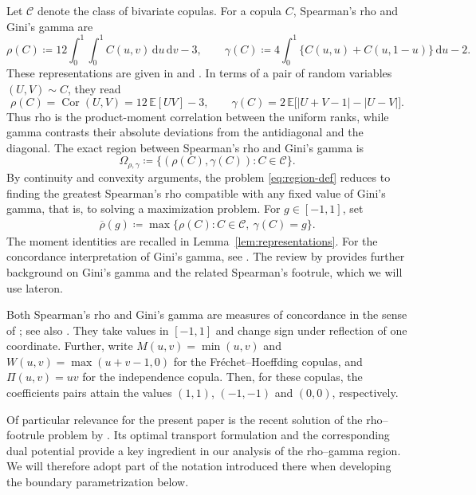 \documentclass{article}
\theoremstyle{definition}
\theoremstyle{remark}
\newcommand{\1}{\mathds{1}}
\newcommand{\de}{\,\mathrm{d}}
\newcommand{\E}{\mathbb{E}}
\newcommand{\CC}{\mathcal{C}}
\newcommand{\Om}{\Omega_{\rho,\gamma}}
\newcommand{\rhoup}{\overline{\rho}}
\begin{document}
Let $\CC$ denote the class of bivariate copulas.
For a copula $C$, Spearman's rho and Gini's gamma are
\begin{equation}\label{eq:defs}
    \rho(C)\coloneqq12\int_0^1\!\int_0^1C(u,v)\de u\de v-3,
    \qquad
    \gamma(C)\coloneqq4\int_0^1\bigl\{C(u,u)+C(u,1-u)\bigr\}\de u-2.
\end{equation}
These representations are given in \citet[Section~5.1]{nelsen2006introduction} and
\citet[Section~2]{bukovsek2021spearman}.
In terms of a pair of random variables $(U,V)\sim C$, they read
\begin{equation}\label{eq:intro-rank-moments}
    \rho(C)=\operatorname{Cor}(U,V)=12\,\E[UV]-3,
    \qquad
    \gamma(C)=2\,\E\bigl[|U+V-1|-|U-V|\bigr].
\end{equation}
Thus rho is the product-moment correlation between the uniform ranks, while
gamma contrasts their absolute deviations from the antidiagonal and the
diagonal.
The exact region between Spearman's rho and Gini's gamma is
\begin{equation}\label{eq:region-def}
    \Om\coloneqq\{(\rho(C),\gamma(C)):C\in\CC\}.
\end{equation}
By continuity and convexity arguments, the problem \eqref{eq:region-def} reduces to finding the
greatest Spearman's rho compatible with any fixed value of Gini's
gamma, that is, to solving a maximization problem.
For $g\in[-1,1]$, set
\begin{align}\label{def_optim_problem}
    \rhoup(g)\coloneqq\max\{\rho(C):C\in\CC,\ \gamma(C)=g\}.
\end{align}
The moment identities are recalled in Lemma~\ref{lem:representations}.
For the concordance interpretation of Gini's gamma, see
\citet{nelsen1998concordance}. The review by
\citet{genest2010spearman} provides further background on Gini's gamma and the related
Spearman's footrule, which we will use lateron.

Both Spearman's rho and Gini's gamma are measures of concordance in the sense of
\citet{scarsini1984measures}; see also
\citet[Section~2.4]{durante2015principles}. They take values in $[-1,1]$
and change sign under reflection of one coordinate. Further, write
$M(u,v)=\min(u,v)$ and $W(u,v)=\max(u+v-1,0)$ for the
Fr\'echet--Hoeffding copulas, and $\Pi(u,v)=uv$ for the independence copula.
Then, for these copulas, the coefficients pairs attain the values $(1,1)$, $(-1,-1)$ and $(0,0)$, respectively.

Of particular relevance for the present paper is the recent
solution of the rho--footrule problem by \citet{ansari2026exact}. Its optimal transport formulation and the corresponding dual potential provide a key ingredient in our analysis of the rho--gamma region. We will therefore adopt part of the notation introduced there when developing the boundary parametrization below.
\end{document}
